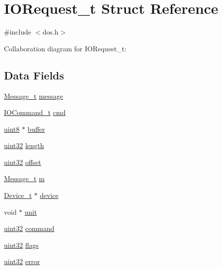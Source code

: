 \hypertarget{structIORequest__t}{\section{I\+O\+Request\+\_\+t Struct Reference}
\label{structIORequest__t}
}


{\ttfamily \#include $<$dos.\+h$>$}



Collaboration diagram for I\+O\+Request\+\_\+t\+:
\subsection*{Data Fields}
\begin{DoxyCompactItemize}
\item 
\hyperlink{structMessage__t}{Message\+\_\+t} \hyperlink{structIORequest__t_aaf8d00358fa7bdb30c42cc92da2b39ac}{message}
\item 
\hyperlink{dos_8h_abace68de957a967888265a60eaab4ff3}{I\+O\+Command\+\_\+t} \hyperlink{structIORequest__t_a09975dead789e9ca82d73b267922bdeb}{cmd}
\item 
\hyperlink{type_8h_a33a5e996e7a90acefb8b1c0bea47e365}{uint8} $\ast$ \hyperlink{structIORequest__t_a89d47dc8e65f31e68d25e18aef0bfdb9}{buffer}
\item 
\hyperlink{type_8h_acbd4acd0d29e2d6c43104827f77d9cd2}{uint32} \hyperlink{structIORequest__t_a8abb560751ab89ed9832e33ccaf29bbe}{length}
\item 
\hyperlink{type_8h_acbd4acd0d29e2d6c43104827f77d9cd2}{uint32} \hyperlink{structIORequest__t_a6943e0aae82e0b581992229b2ec51db4}{offset}
\item 
\hyperlink{structMessage__t}{Message\+\_\+t} \hyperlink{structIORequest__t_a6415480c05aae21f3e52f6a0d69564e0}{m}
\item 
\hyperlink{structDevice__t}{Device\+\_\+t} $\ast$ \hyperlink{structIORequest__t_ab0f35ee6afa72fc763c1c25bc0425a20}{device}
\item 
void $\ast$ \hyperlink{structIORequest__t_a847ff0c9d9b5ddbb2ebe7215283f54b3}{unit}
\item 
\hyperlink{type_8h_acbd4acd0d29e2d6c43104827f77d9cd2}{uint32} \hyperlink{structIORequest__t_a2432f9f617a1372505d0902878c6d387}{command}
\item 
\hyperlink{type_8h_acbd4acd0d29e2d6c43104827f77d9cd2}{uint32} \hyperlink{structIORequest__t_a920984e3c855b294c6c7fd67b6a229da}{flags}
\item 
\hyperlink{type_8h_acbd4acd0d29e2d6c43104827f77d9cd2}{uint32} \hyperlink{structIORequest__t_a5ee59ce665e6426dcc2c0163eafb3d26}{error}
\end{DoxyCompactItemize}



